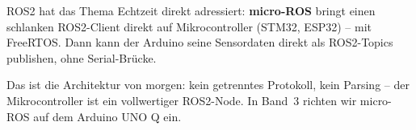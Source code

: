 \begin{robotikBox}
ROS2 hat das Thema Echtzeit direkt adressiert:
\textbf{micro-ROS} bringt einen schlanken ROS2-Client direkt
auf Mikrocontroller (STM32, ESP32) -- mit FreeRTOS.
Dann kann der Arduino seine Sensordaten direkt als ROS2-Topics
publishen, ohne Serial-Brücke.

Das ist die Architektur von morgen: kein getrenntes Protokoll,
kein Parsing -- der Mikrocontroller ist ein vollwertiger ROS2-Node.
In Band~3 richten wir micro-ROS auf dem Arduino UNO Q ein.
\end{robotikBox}
